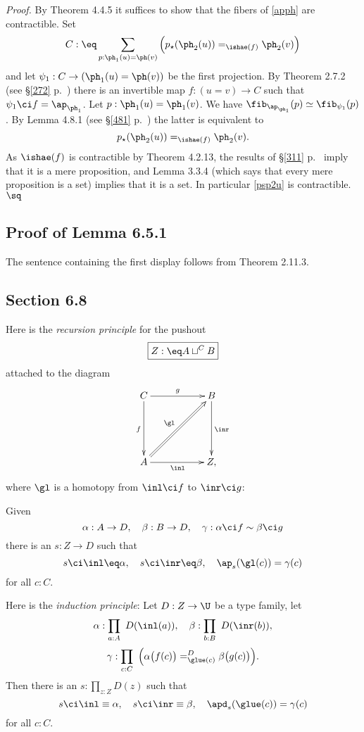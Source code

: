 \documentclass[12pt]{article}
\begin{document}
\nn\emph{Proof.} By Theorem 4.4.5 it suffices to show that the fibers of \eqref{apph} are contractible. Set 
$$
C:\eq\sum_{p:\ph_1(u)=\ph(v)}\Big(p_\star(\ph_2(u))=_{\ishae(f)}\ph_2(v)\Big)
$$ 
and let $\psi_1:C\to(\ph_1(u)=\ph(v))$ be the first projection. By Theorem 2.7.2 (see \S\ref{272} p.~\pageref{272}) there is an invertible map $f:(u=v)\to C$ such that $\psi_1\ci f=\ap_{\ph_1}$. Let $p:\ph_1(u)=\ph_1(v)$. We have $\fib_{\ap_{\ph_1}}(p)\simeq\fib_{\psi_1}(p)$. By Lemma 4.8.1 (see \S\ref{481} p.~\pageref{481}) the latter is equivalent to 
\begin{equation}\label{psp2u}
p_\star(\ph_2(u))=_{\ishae(f)}\ph_2(v).
\end{equation}  
As $\ishae(f)$ is contractible by Theorem 4.2.13, the results of \S\ref{311} p.~\pageref{311} imply that it is a mere proposition, and Lemma 3.3.4 (which says that every mere proposition is a set) implies that it is a set. In particular \eqref{psp2u} is contractible. $\sq$


\subsection{Proof of Lemma 6.5.1}

The sentence containing the first display follows from Theorem 2.11.3.


\subsection{Section 6.8}

Here is the \emph{recursion principle} for the pushout 
$$
\boxed{Z:\eq A\sqcup^CB}
$$ 
attached to the diagram 
$$
\xymatrix{
C\ar[rr]^g\ar[dd]_f&&B\ar[dd]^{\inr}\\ \\ 
A\ar[rr]_{\inl}\ar@{=>}[uurr]^{\gl}&&Z,
}
$$ 
where $\gl$ is a homotopy from $\inl\ci f$ to $\inr\ci g$: 

Given 
$$
\alpha:A\to D,\quad\beta:B\to D,\quad\gamma:\alpha\ci f\sim\beta\ci g
$$ 
there is an $s:Z\to D$ such that 
$$
s\ci\inl\eq\alpha,\quad s\ci\inr\eq\beta,\quad\ap_s(\gl(c))=\gamma(c)
$$ 
for all $c:C$.

Here is the \emph{induction principle}: Let $D:Z\to\U$ be a type family, let 
$$
\alpha:\prod_{a:A}\ D(\inl(a)),\quad\beta:\prod_{b:B}\ D(\inr(b)),
$$
$$
\gamma:\prod_{c:C}\ \Big(\alpha\big(f(c)\big)=^D_{\glue(c)}\beta\big(g(c)\big)\Big).
$$ 
Then there is an $s:\prod_{z:Z}D(z)$ such that 
$$
s\ci\inl\equiv\alpha,\quad s\ci\inr\equiv\beta,\quad\apd_s(\glue(c))=\gamma(c)
$$ 
for all $c:C$. 
\end{document}

